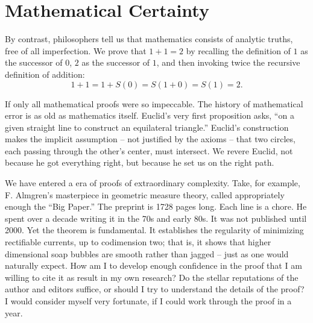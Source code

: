 \documentclass{llncs}
\begin{document}
\section{Mathematical Certainty}

By contrast, philosophers tell us that
mathematics consists of analytic truths,
free of all imperfection.  We prove that $1+1=2$ by
recalling the definition of $1$ as the successor of $0$,
$2$ as the successor of $1$, and then invoking twice the recursive
definition
of addition: 
  $$1+1 = 1 + S(0) = S(1 + 0) = S(1) = 2.$$

If only all mathematical proofs were so impeccable.  
The history of mathematical error is as old as mathematics itself.
Euclid's very first proposition asks, ``on a given straight line
to construct an equilateral triangle.''  Euclid's construction
makes the implicit assumption -- not justified by the axioms -- that
two circles, each passing through the other's center, must intersect.
We revere Euclid, not because he got everything right, but because
he set us on the right path.

We have entered a era of proofs of extraordinary complexity.
Take, for example, F. Almgren's masterpiece in geometric measure
theory, called appropriately enough the ``Big Paper.'' 
The preprint is
1728 pages long. Each line is a chore. He spent over a decade writing it in the 70s and
early 80s.  It was not published until 2000.  Yet the theorem
is fundamental.  It establishes the regularity of minimizing
rectifiable currents, up to codimension two;  that is, 
it shows that higher dimensional soap bubbles are smooth
rather than jagged -- just
as one would naturally expect.  How am I to develop enough confidence
in the proof that I am willing to cite it as result in my own research?
Do the stellar reputations of the author
and editors suffice, or should I try to understand the details of the
proof?  I
would consider myself very fortunate, if I could work through the proof
in a year.
\end{document}
